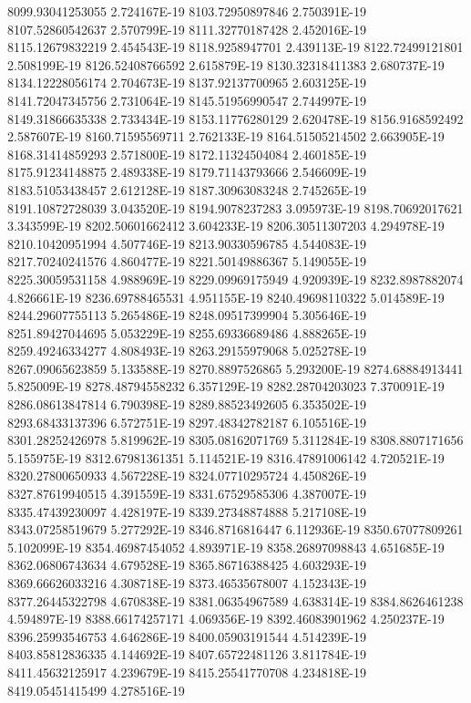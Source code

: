 8099.93041253055  2.724167E-19
8103.72950897846  2.750391E-19
8107.52860542637  2.570799E-19
8111.32770187428  2.452016E-19
8115.12679832219  2.454543E-19
8118.9258947701  2.439113E-19
8122.72499121801  2.508199E-19
8126.52408766592  2.615879E-19
8130.32318411383  2.680737E-19
8134.12228056174  2.704673E-19
8137.92137700965  2.603125E-19
8141.72047345756  2.731064E-19
8145.51956990547  2.744997E-19
8149.31866635338  2.733434E-19
8153.11776280129  2.620478E-19
8156.9168592492  2.587607E-19
8160.71595569711  2.762133E-19
8164.51505214502  2.663905E-19
8168.31414859293  2.571800E-19
8172.11324504084  2.460185E-19
8175.91234148875  2.489338E-19
8179.71143793666  2.546609E-19
8183.51053438457  2.612128E-19
8187.30963083248  2.745265E-19
8191.10872728039  3.043520E-19
8194.9078237283  3.095973E-19
8198.70692017621  3.343599E-19
8202.50601662412  3.604233E-19
8206.30511307203  4.294978E-19
8210.10420951994  4.507746E-19
8213.90330596785  4.544083E-19
8217.70240241576  4.860477E-19
8221.50149886367  5.149055E-19
8225.30059531158  4.988969E-19
8229.09969175949  4.920939E-19
8232.8987882074  4.826661E-19
8236.69788465531  4.951155E-19
8240.49698110322  5.014589E-19
8244.29607755113  5.265486E-19
8248.09517399904  5.305646E-19
8251.89427044695  5.053229E-19
8255.69336689486  4.888265E-19
8259.49246334277  4.808493E-19
8263.29155979068  5.025278E-19
8267.09065623859  5.133588E-19
8270.8897526865  5.293200E-19
8274.68884913441  5.825009E-19
8278.48794558232  6.357129E-19
8282.28704203023  7.370091E-19
8286.08613847814  6.790398E-19
8289.88523492605  6.353502E-19
8293.68433137396  6.572751E-19
8297.48342782187  6.105516E-19
8301.28252426978  5.819962E-19
8305.08162071769  5.311284E-19
8308.8807171656  5.155975E-19
8312.67981361351  5.114521E-19
8316.47891006142  4.720521E-19
8320.27800650933  4.567228E-19
8324.07710295724  4.450826E-19
8327.87619940515  4.391559E-19
8331.67529585306  4.387007E-19
8335.47439230097  4.428197E-19
8339.27348874888  5.217108E-19
8343.07258519679  5.277292E-19
8346.8716816447  6.112936E-19
8350.67077809261  5.102099E-19
8354.46987454052  4.893971E-19
8358.26897098843  4.651685E-19
8362.06806743634  4.679528E-19
8365.86716388425  4.603293E-19
8369.66626033216  4.308718E-19
8373.46535678007  4.152343E-19
8377.26445322798  4.670838E-19
8381.06354967589  4.638314E-19
8384.8626461238  4.594897E-19
8388.66174257171  4.069356E-19
8392.46083901962  4.250237E-19
8396.25993546753  4.646286E-19
8400.05903191544  4.514239E-19
8403.85812836335  4.144692E-19
8407.65722481126  3.811784E-19
8411.45632125917  4.239679E-19
8415.25541770708  4.234818E-19
8419.05451415499  4.278516E-19
